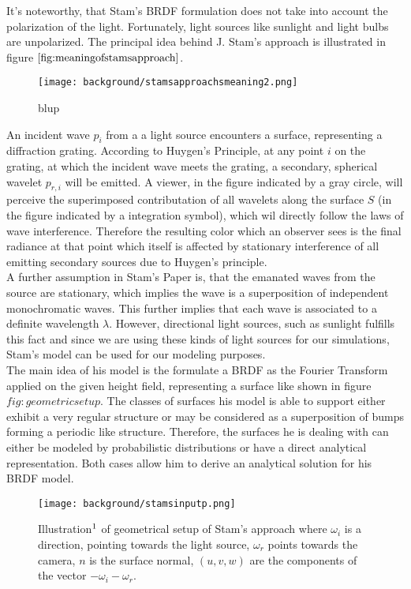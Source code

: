 It's noteworthy, that Stam's BRDF formulation does not take into account the polarization of the light. Fortunately, light sources like sunlight and light bulbs are unpolarized. The principal idea behind J. Stam's approach is illustrated in figure $\ref{fig:meaningofstamsapproach}$. 
\begin{figure}[H]
  \centering
  \texttt{[image: background/stamsapproachsmeaning2.png]}
  \caption[Idea behind Stam's approach]{blup}
  \label{fig:meaningofstamsapproach}  
\end{figure}
An incident wave $p_i$ from a a light source encounters a surface, representing a diffraction grating. According to Huygen's Principle, at any point $i$ on the grating, at which the incident wave meets the grating, a secondary, spherical wavelet $p_{r,i}$ will be emitted. A viewer, in the figure indicated by a gray circle, will perceive the superimposed contributation of all wavelets along the surface $S$ (in the figure indicated by a integration symbol), which wil directly follow the laws of wave interference. Therefore the resulting color which an observer sees is the final radiance at that point which itself is affected by stationary interference of all emitting secondary sources due to Huygen's principle. \\

A further assumption in Stam's Paper is, that the emanated waves from the source are stationary, which implies the wave is a superposition of independent monochromatic waves. This further implies that each wave is associated to a definite wavelength $\lambda$. However, directional light sources, such as sunlight fulfills this fact and since we are using these kinds of light sources for our simulations, Stam's model can be used for our modeling purposes. \\

The main idea of his model is the formulate a BRDF as the Fourier Transform applied on the given height field, representing a surface like shown in figure $fig:geometricsetup$. The classes of surfaces his model is able to support either exhibit a very regular structure or may be considered as a superposition of bumps forming a periodic like structure. Therefore, the surfaces he is dealing with can either be modeled by probabilistic distributions or have a direct analytical representation. Both cases allow him to derive an analytical solution for his BRDF model.

\begin{figure}[H]
  \centering
  \texttt{[image: background/stamsinputp.png]}
  \caption[Stam's geometrical setup]{Illustration$\footnotemark$ of geometrical setup of Stam's approach where $\omega_i$ is a direction, pointing towards the light source, $\omega_r$ points towards the camera, $n$ is the surface normal, $(u,v,w)$ are the components of the vector $-\omega_i - \omega_r$.}
  \label{fig:geometricsetup}  
\end{figure}


